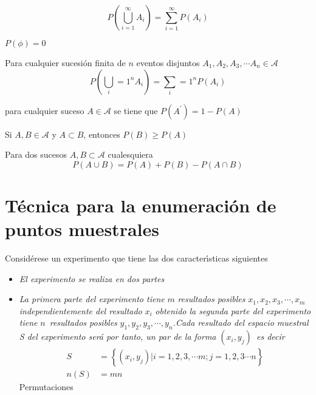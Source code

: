 \[
P\left(  \bigcup_{i=1}^{\infty}A_{i}\right)  =\sum_{i=1}^{\infty}P\left(
A_{i}\right)
\]%

\begin{theorem}
$P\left(   \phi\right)   =0$
\end{theorem} %

\begin{theorem}
Para cualquier sucesi\'{o}n finita de $n$ eventos disjuntos $A_{1},A_{2}
,A_{3},\cdots A_{n}\in\mathcal{A}$ \[ P\left(   \bigcup_i=1^nA_i\right)
=\sum_i=1^nP\left(   A_i\right)  \]
\end{theorem} %

\begin{theorem}
para cualquier suceso $A\in\mathcal{A}$ se tiene que $P\left(   A^{\prime
}\right)   =1-P\left(   A\right)   $
\end{theorem} %

\begin{theorem}
Si $A,B\in\mathcal{A}$ y $A\subset B$, entonces $P\left(   B\right)   \geq
P\left(   A\right)   $
\end{theorem} 

\begin{center}
\end{center}%

\begin{theorem}
Para dos sucesos $A,B\subset\mathcal{A}$ cualesquiera \[ P\left(   A\cup
B\right)   =P\left(   A\right)   +P\left(   B\right)   -P\left(  A\cap
B\right)  \]
\end{theorem} 

\section{T\'{e}cnica para la enumeraci\'{o}n de puntos muestrales}%

\begin{theorem}
Consid\'{e}rese un experimento que tiene las dos cara\-cter\'{\i}sticas
siguientes
\end{theorem} 

\begin{itemize}
\item \textit{El experimento se realiza en dos partes }

\item \textit{La primera parte del experimento tiene }$m$ \textit{resultados
posibles }$x_{1},x_{2},x_{3},\cdots,x_{m}$ \textit{independientemente del
resultado} $x_{i}$ \textit{obtenido la segunda parte del experimento tiene
}$n$\textit{\ resultados posibles }$y_{1},y_{2},y_{3},\cdots,y_{n}%
$\textit{.\newline Cada resultado del espacio muestral S del experimento
ser\'{a} por tanto, un par de la forma }$\left(  x_{i},y_{j}\right)
$\textit{\ es decir }
\begin{align*}
S &  =\left\{  \left(  x_{i},y_{j}\right)  |i=1,2,3,\cdots m;j=1,2,3\cdots
n\right\}  \\
n\left(  S\right)   &  =mn
\end{align*}
Permutaciones
\end{itemize}%

